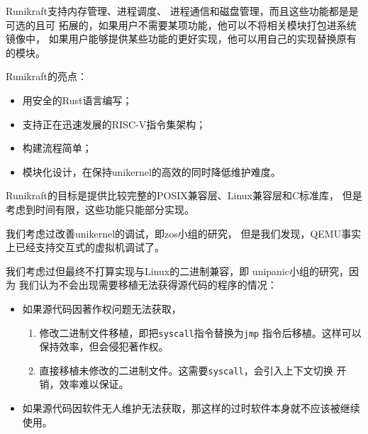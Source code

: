 \documentclass[UTF8,fontset=none,linespread=1.15]{ctexart}
\begin{document}
Runikraft支持内存管理、进程调度、
进程通信和磁盘管理，而且这些功能都是是可选的且可
拓展的，如果用户不需要某项功能，他可以不将相关模块打包进系统镜像中，
如果用户能够提供某些功能的更好实现，他可以用自己的实现替换原有的模块。

Runikraft的亮点：
\begin{itemize}
\item 用安全的Rust语言编写；
\item 支持正在迅速发展的RISC-V指令集架构；
\item 构建流程简单；
\item 模块化设计，在保持unikernel的高效的同时降低维护难度。
\end{itemize}

Runikraft的目标是提供比较完整的POSIX兼容层、Linux兼容层和C标准库，
但是考虑到时间有限，这些功能只能部分实现。


我们考虑过改善unikernel的调试，即zos小组的研究，
但是我们发现，QEMU事实上已经支持交互式的虚拟机调试了。

我们考虑过但最终不打算实现与Linux的二进制兼容，即
unipanic小组的研究，因为
我们认为不会出现需要移植无法获得源代码的程序的情况：
\begin{itemize}
\item 如果源代码因著作权问题无法获取，
    \begin{enumerate}
    \item 修改二进制文件移植，即把\texttt{syscall}指令替换为\texttt{jmp}
    指令后移植。这样可以保持效率，但会侵犯著作权。
    \item 直接移植未修改的二进制文件。这需要\texttt{syscall}，会引入上下文切换
    开销，效率难以保证。
    \end{enumerate}
\item 如果源代码因软件无人维护无法获取，那这样的过时软件本身就不应该被继续使用。
\end{itemize}
\end{document}
